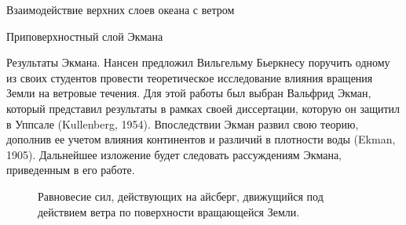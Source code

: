 \begin{chapter}{Взаимодействие верхних слоев океана с ветром}
\begin{section}{Приповерхностный слой Экмана}
\begin{paragraph}{Результаты Экмана.}
Нансен предложил Вильгельму Бьеркнесу поручить
одному из своих студентов провести теоретическое исследование влияния вращения
Земли на ветровые течения. Для этой работы был выбран Вальфрид Экман, который
представил результаты в рамках своей диссертации, которую он защитил 
в Уппсале (Kullenberg, 1954). Впоследствии Экман развил свою теорию, дополнив 
ее учетом влияния континентов и различий в плотности воды (Ekman, 1905). 
Дальнейшее изложение будет следовать рассуждениям Экмана, приведенным 
в его работе.
%

\begin{figure}[t!]
\centering
{}
\caption{Равновесие сил, действующих на айсберг, движущийся под действием
ветра по поверхности вращающейся Земли.}
\label{fig:forcesketch}
\vspace{-3ex}
\end{figure}
%
%


\end{paragraph}
\end{section}
\end{chapter}
